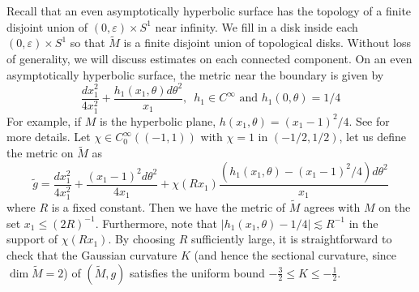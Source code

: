 \documentclass[10pt]{amsart}
\renewcommand{\epsilon}{\varepsilon}
\newcommand{\1}{{\bf 1}}
\renewcommand{\epsilon}{\varepsilon}
\begin{document}
Recall that an even asymptotically hyperbolic surface has the topology of a finite disjoint union of $(0,\epsilon)\times S^1$ near infinity. We fill in a disk inside each $(0,\epsilon)\times S^1$ so that $\tilde{M}$ is a finite disjoint union of topological disks. Without loss of generality, we will discuss estimates on each connected component. On an even asymptotically hyperbolic surface, the metric near the boundary is given by
\begin{equation*}
\frac{dx_1^2}{4x_1^2}+\frac{h_1(x_1,\theta)d\theta^2}{x_1},\,\,\, h_1\in C^\infty\,\, \text{and} \,\, h_1(0,\theta)=1/4
\end{equation*}
For example, if $M$ is the hyperbolic plane, $h(x_1,\theta)=(x_1-1)^2/4$. See \cite[Chapter 5]{dyatlov2019mathematical} for more details.
Let $\chi\in C_0^\infty((-1,1))$ with $\chi=1$ in $(-1/2,1/2)$, let us define the 
 metric on $\tilde M$ as 
\begin{equation}\label{tildeM}
\tilde g= \frac{dx_1^2}{4x_1^2}+\frac{(x_1-1)^2 d\theta^2}{4x_1}+\chi(Rx_1)\frac{(h_1(x_1,\theta)-(x_1-1)^2/4)d\theta^2}{x_1}
\end{equation}
where $R$ is a fixed constant. Then we have the metric of $\tilde M$ agrees with $M$ on the set $x_1\le (2R)^{-1}$. Furthermore, note that $|h_1(x_1,\theta)-1/4|\lesssim R^{-1}$ in the support of 
$\chi(Rx_1)$. By choosing $R$ sufficiently large, it is straightforward to check that the Gaussian curvature $K$ (and hence the sectional curvature, since  $\dim\tilde M=2$) of $(\tilde M,g)$ satisfies the uniform bound $-\frac32\le K\le -\frac12$.



\end{document}
